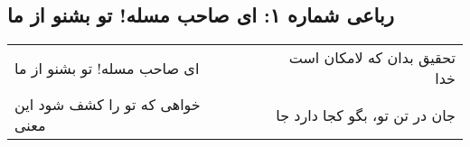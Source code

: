 \begin{center}
\section*{رباعی شماره ۱: ای صاحب مسله! تو بشنو از ما}
\label{sec:001}
\begin{longtable}{l p{0.5cm} r}
ای صاحب مسله! تو بشنو از ما
&&
تحقیق بدان که لامکان است خدا
\\
خواهی که تو را کشف شود این معنی
&&
جان در تن تو، بگو کجا دارد جا
\\
\end{longtable}
\end{center}
